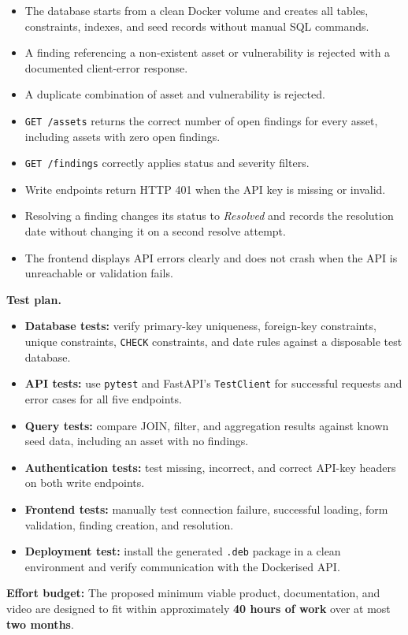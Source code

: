 \documentclass[11pt,a4paper]{article}
\begin{document}
\begin{itemize}[topsep=2pt]
  \item The database starts from a clean Docker volume and creates all tables,
        constraints, indexes, and seed records without manual SQL commands.
  \item A finding referencing a non-existent asset or vulnerability is rejected
        with a documented client-error response.
  \item A duplicate combination of asset and vulnerability is rejected.
  \item \texttt{GET /assets} returns the correct number of open findings for
        every asset, including assets with zero open findings.
  \item \texttt{GET /findings} correctly applies status and severity filters.
  \item Write endpoints return HTTP 401 when the API key is missing or invalid.
  \item Resolving a finding changes its status to \emph{Resolved} and records
        the resolution date without changing it on a second resolve attempt.
  \item The frontend displays API errors clearly and does not crash when the API
        is unreachable or validation fails.
\end{itemize}

\textbf{Test plan.}

\begin{itemize}[topsep=2pt]
  \item \textbf{Database tests:} verify primary-key uniqueness, foreign-key
        constraints, unique constraints, \texttt{CHECK} constraints, and date
        rules against a disposable test database.
  \item \textbf{API tests:} use \texttt{pytest} and FastAPI's
        \texttt{TestClient} for successful requests and error cases for all five
        endpoints.
  \item \textbf{Query tests:} compare JOIN, filter, and aggregation results
        against known seed data, including an asset with no findings.
  \item \textbf{Authentication tests:} test missing, incorrect, and correct
        API-key headers on both write endpoints.
  \item \textbf{Frontend tests:} manually test connection failure, successful
        loading, form validation, finding creation, and resolution.
  \item \textbf{Deployment test:} install the generated \texttt{.deb} package
        in a clean environment and verify communication with the Dockerised API.
\end{itemize}

\begin{infobox}
\textbf{Effort budget:} The proposed minimum viable product, documentation, and
video are designed to fit within approximately \textbf{40 hours of work} over
at most \textbf{two months}.
\end{infobox}
\end{document}
